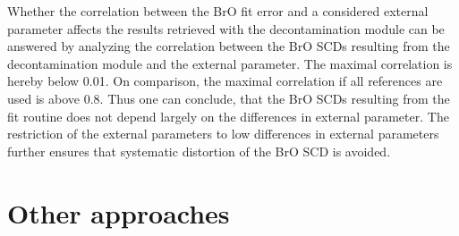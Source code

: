 \documentclass  [
  paper    = a4,
  BCOR     = 10mm,
  twoside,
  fontsize = 12pt,
  fleqn,
  toc      = bibnumbered,
  toc      = listofnumbered,
  numbers  = noendperiod,
  headings = normal,
  listof   = leveldown,
  version  = 3.03
]                                       {scrreprt}
\begin{document}
Whether the correlation between the BrO fit error and a considered external parameter affects the results retrieved with the decontamination module can be answered by analyzing the correlation between the BrO SCDs resulting from the decontamination module and the external parameter.
The maximal correlation is hereby below 0.01. 
On comparison, the maximal correlation if all references are used is above 0.8. Thus one can conclude, that the BrO SCDs resulting from the fit routine does not depend largely on the differences in external parameter. The restriction of the external parameters to low differences in external parameters further ensures that systematic distortion of the BrO SCD is avoided. \\

%    
%
%
%
\section{Other approaches}
\end{document}
